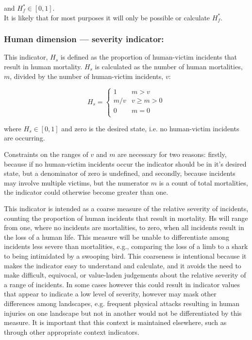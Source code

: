 \documentclass[fleqn,10pt]{olplainarticle}
\begin{document}
and $H_f^\ast \in [0,1]$.\\

It is likely that for most purposes it will only be possible or calculate $H_f^\ast$.


\subsubsection*{Human dimension --- severity indicator:}
This indicator, $H_s$ is defined as the proportion of human-victim incidents that result in human mortality. $H_s$ is calculated as the number of human mortalities, $m$, divided by the number of human-victim incidents, $v$:

\begin{equation*}
    H_s = \begin{cases}
        1 & m > v \\
        m/v & v \ge m > 0 \\
        0       & m = 0 \\
    \end{cases}
\end{equation*}



where $H_s \in [0,1]$ and zero is the desired state, i.e. no human-victim incidents are occurring. 

Constraints on the ranges of $v$ and $m$ are necessary for two reasons: firstly, because if no human-victim incidents occur the indicator should be in it's desired state, but a denominator of zero is undefined, and secondly,  because incidents may involve multiple victims, but the numerator $m$ is a count of total mortalities, the indicator could otherwise become greater than one.

This indicator is intended as a coarse measure of the relative severity of incidents, counting the proportion of human incidents that result in mortality. Hs will range from one, where no incidents are mortalities, to zero, when all incidents result in the loss of a human life. This measure will be unable to differentiate among incidents less severe than mortalities, e.g., comparing the loss of a limb to a shark to being intimidated by a swooping bird. This coarseness is intentional because it makes the indicator easy to understand and calculate, and it avoids the need to make difficult, equivocal, or value-laden judgements about the relative severity of a range of incidents. In some cases however this could result in indicator values that appear to indicate a low level of severity, however may mask other differences among landscapes, e.g. frequent physical attacks resulting in human injuries on one landscape but not in another would not be differentiated by this measure. It is important that this context is maintained elsewhere, such as through other appropriate context indicators.
\end{document}
